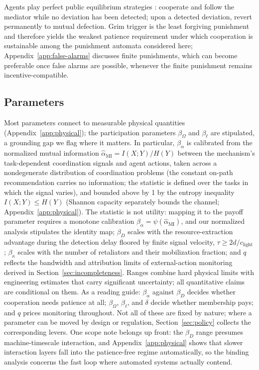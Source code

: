 \documentclass[manuscript,screen,review]{jair}
\begin{document}
Agents play perfect public equilibrium strategies \cite{fudenberg.1994}: cooperate and follow the mediator while no deviation has been detected; upon a detected deviation, revert permanently to mutual defection. Grim trigger is the least forgiving punishment and therefore yields the weakest patience requirement under which cooperation is sustainable among the punishment automata considered here; Appendix~\ref{app:false-alarms} discusses finite punishments, which can become preferable once false alarms are possible, whenever the finite punishment remains incentive-compatible.

\subsection{Parameters}
\label{sec:parameters}

Most parameters connect to measurable physical quantities (Appendix~\ref{app:physical}); the participation parameters $\beta_\Omega$ and $\beta_\ell$ are stipulated, a grounding gap we flag where it matters. In particular, $\beta_\alpha$ is calibrated from the normalized mutual information $\hat\alpha_{\mathrm{MI}} = I(X;Y)/H(Y)$ between the mechanism's task-dependent coordination signals and agent actions, taken across a nondegenerate distribution of coordination problems (the constant on-path recommendation carries no information; the statistic is defined over the tasks in which the signal varies), and bounded above by 1 by the entropy inequality $I(X;Y) \leq H(Y)$ \cite{cover.thomas.2006} (Shannon capacity separately bounds the channel; Appendix~\ref{app:physical}). The statistic is not utility: mapping it to the payoff parameter requires a monotone calibration $\beta_\alpha = \psi(\hat\alpha_{\mathrm{MI}})$, and our normalized analysis stipulates the identity map; $\beta_D$ scales with the resource-extraction advantage during the detection delay floored by finite signal velocity, $\tau \geq 2d/c_{\mathrm{light}}$; $\beta_\kappa$ scales with the number of retaliators and their mobilization fraction; and $q$ reflects the bandwidth and attribution limits of external-action monitoring derived in Section~\ref{sec:incompleteness}. Ranges combine hard physical limits with engineering estimates that carry significant uncertainty; all quantitative claims are conditional on them. As a reading guide: $\beta_\alpha$ against $\beta_D$ decides whether cooperation needs patience at all; $\beta_\Omega$, $\beta_\ell$, and $\delta$ decide whether membership pays; and $q$ prices monitoring throughout. Not all of these are fixed by nature; where a parameter can be moved by design or regulation, Section~\ref{sec:policy} collects the corresponding levers. One scope note belongs up front: the $\beta_D$ range presumes machine-timescale interaction, and Appendix~\ref{app:physical} shows that slower interaction layers fall into the patience-free regime automatically, so the binding analysis concerns the fast loop where automated systems actually contend.
\end{document}
